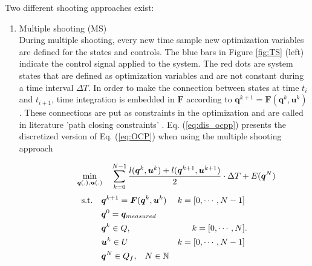 Two different shooting approaches exist:\\
\begin{enumerate}
	\item Multiple shooting (MS)\\
    During multiple shooting, every new time sample new optimization variables are defined for the states and controls.
	 The blue bars in Figure \ref{fig:TS} (left) indicate the control signal applied to the system.  The red dots are system states that are defined as optimization variables and are not constant during a time interval $\Delta T$. In order to make the connection between states at time $t_i$ and $t_{i+1}$, time integration is embedded in $\bm{F}$ according to $\bm{q}^{k+1} = \bm{F}(\bm{q}^k, \bm{u}^k)$. These connections are put as constraints in the optimization and are called in literature 'path closing constraints' \cite{Gillis2019}. Eq. (\ref{eq:dis_ocpp}) presents the discretized version of Eq. (\ref{eq:OCP}) when using the multiple shooting approach

	\begin{equation*}
	\label{eq:OCP_dis}
	\begin{aligned}
	\hspace{10mm}\min_{\bm{q}(.),\bm{u}(.)} \quad & \sum_{k = 0}^{N-1}\frac{l(\bm{q}^{k},\bm{u}^{k})+l(\bm{q}^{k+1},\bm{u}^{k+1})}{2}\cdot \Delta T + E(\bm{q}^{N}) \\
	\end{aligned}
	\end{equation*}
	\begin{equation}\label{eq:dis_ocpp}
	\begin{aligned}
	\textrm{s.t.} \quad & \bm{q}^{k+1} = \bm{F}(\bm{q}^{k}, \bm{u}^{k}) & k = [0,\cdots, N-1]\\
	& \bm{q}^{0}= \bm{q}_{measured} \\
	& \bm{q}^{k}\in Q,\hspace{3 mm} & k = [0,\cdots, N]\\
	& \bm{u}^{k}\in U \hspace{3 mm} & k = [0,\cdots, N-1]\\
	& \bm{q}^{N}\in Q_f,\hspace{3 mm} N \in \mathbb{N}
	\end{aligned}.
	\end{equation}


\end{enumerate}
